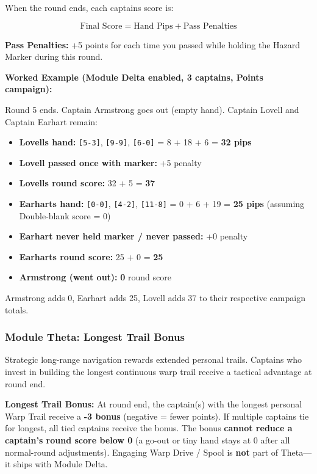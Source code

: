 \documentclass[11pt]{article}
\begin{document}
When the round ends, each captain\textquotesingle s score is:

\[\text{Final Score} = \text{Hand Pips} + \text{Pass Penalties}\]

\textbf{Pass Penalties:} +5 points for each time you passed while
holding the Hazard Marker during this round.

\textbf{Worked Example (Module Delta enabled, 3 captains, Points
campaign):}

Round 5 ends. Captain Armstrong goes out (empty hand). Captain Lovell
and Captain Earhart remain:

\begin{itemize}
\item
  \textbf{Lovell\textquotesingle s hand:} \texttt{{[}5-3{]}},
  \texttt{{[}9-9{]}}, \texttt{{[}6-0{]}} = 8 + 18 + 6 = \textbf{32 pips}
\item
  \textbf{Lovell passed once with marker:} +5 penalty
\item
  \textbf{Lovell\textquotesingle s round score:} 32 + 5 = \textbf{37}
\item
  \textbf{Earhart\textquotesingle s hand:} \texttt{{[}0-0{]}},
  \texttt{{[}4-2{]}}, \texttt{{[}11-8{]}} = 0 + 6 + 19 = \textbf{25
  pips} (assuming Double-blank score = 0)
\item
  \textbf{Earhart never held marker / never passed:} +0 penalty
\item
  \textbf{Earhart\textquotesingle s round score:} 25 + 0 = \textbf{25}
\item
  \textbf{Armstrong (went out):} \textbf{0} round score
\end{itemize}

Armstrong adds 0, Earhart adds 25, Lovell adds 37 to their respective
campaign totals.

\subsubsection{Module Theta: Longest Trail
Bonus}\label{module-theta-longest-trail-bonus}

Strategic long-range navigation rewards extended personal trails.
Captains who invest in building the longest continuous warp trail
receive a tactical advantage at round end.

\textbf{Longest Trail Bonus:} At round end, the captain(s) with the
longest personal Warp Trail receive a \textbf{-3 bonus} (negative =
fewer points). If multiple captains tie for longest, all tied captains
receive the bonus. The bonus \textbf{cannot reduce a captain's round
score below 0} (a go-out or tiny hand stays at 0 after all normal-round
adjustments). Engaging Warp Drive / Spool is \textbf{not} part of
Theta---it ships with Module Delta.
\end{document}
